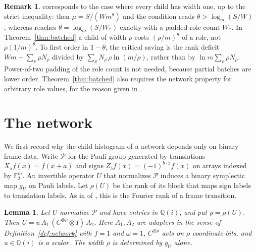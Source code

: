 \documentclass[11pt]{article}
\newtheorem{lemma}[theorem]{Lemma}
\theoremstyle{definition}
\newtheorem{remark}[theorem]{Remark}
\newcommand{\F}{\mathbb F}
\begin{document}
\begin{remark}
\cite[Theorem~2.6]{oai-dft} corresponds to the case where every child has width
one, up to the strict inequality: then $\mu=S/(Wm^\theta)$ and the condition
reads $\theta>\log_m(S/W)$, whereas \cite[Theorem~2.6]{oai-dft} reaches
$\theta=\log_m(S/W_*)$ exactly with a padded role count $W_*$. In
Theorem~\ref{thm:batched} a child of width $\rho$ costs $(\rho/m)^\theta$ of a
role, not $\rho(1/m)^\theta$. To first order in $1-\theta$, the critical saving
is the rank deficit $Wm-\sum_\rho\rho N_\rho$ divided by
$\sum_\rho N_\rho\,\rho\ln(m/\rho)$, rather than by $\ln m\sum_\rho\rho N_\rho$.
Power-of-two padding of the role count is not needed, because partial batches
are lower order. Theorem~\ref{thm:batched} also requires the network property for
arbitrary role values, for the reason given in \cite[Remark~2.7]{oai-dft}.
\end{remark}

\section{The network}\label{sec:network}
We first record why the child histogram of a network depends only on binary
frame data. Write $\mathcal P$ for the Pauli group generated by translations
$X_a f(x)=f(x+a)$ and signs $Z_bf(x)=(-1)^{b\cdot x}f(x)$ on arrays indexed by
$\F_2^m$. An invertible operator $U$ that normalizes $\mathcal P$ induces a
binary symplectic map $g_U$ on Pauli labels. Let $\rho(U)$ be the rank of its
block that maps sign labels to translation labels. As in
 of \cite{cms}, this is the Fourier rank of
a frame transition.

\begin{lemma}\label{lem:normal}
Let $U$ normalize $\mathcal P$ and have entries in $\mathbb Q(i)$, and put
$\rho=\rho(U)$. Then $U=u\,A_1\,(C^{\otimes\rho}\otimes I)\,A_2$. Here $A_1,A_2$
are adapters in the sense of Definition~\ref{def:network} with $f=1$ and
$\omega=1$, $C^{\otimes\rho}$ acts on $\rho$ coordinate bits, and
$u\in\mathbb Q(i)$ is a scalar. The width $\rho$ is determined by $g_U$ alone.
\end{lemma}
\end{document}
